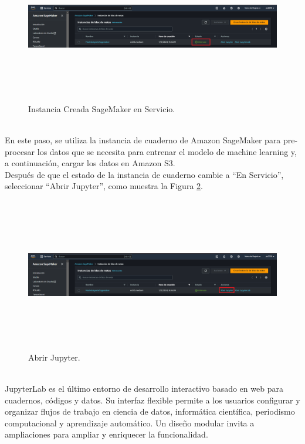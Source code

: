 \documentclass[a4paper,10pt, oneside, titlepage]{article}
\begin{document}
	\begin{figure}[!h]
		\centering
		\includegraphics[width = 1\linewidth, height = 6.7cm]{Instancia_Creada_SageMaker_Online.png}
		\caption{Instancia Creada SageMaker en Servicio.}
		\label{Instancia_Creada_SageMaker_Online}
	\end{figure} \\
	\indent En este paso, se utiliza la instancia de cuaderno de Amazon SageMaker para pre-procesar los datos que se necesita para entrenar el modelo de machine learning y, a continuación, cargar los datos en Amazon S3. \\\newline
	\indent Después de que el estado de la instancia de cuaderno cambie a ``En Servicio'', seleccionar ``Abrir Jupyter'', como muestra la Figura \ref{SageMaker_Jupyter}.
	\begin{figure}[!h]
		\centering
		\includegraphics[width = 1\linewidth, height = 6.7cm]{SageMaker_Jupyter.png}
		\caption{Abrir Jupyter.}
		\label{SageMaker_Jupyter}
	\end{figure} \\
	\indent  JupyterLab es el último entorno de desarrollo interactivo basado en web para cuadernos, códigos y datos. Su interfaz flexible permite a los usuarios configurar y organizar flujos de trabajo en ciencia de datos, informática científica, periodismo computacional y aprendizaje automático. Un diseño modular invita a ampliaciones para ampliar y enriquecer la funcionalidad. \cite{Jupyter} \\\newline
\end{document}
